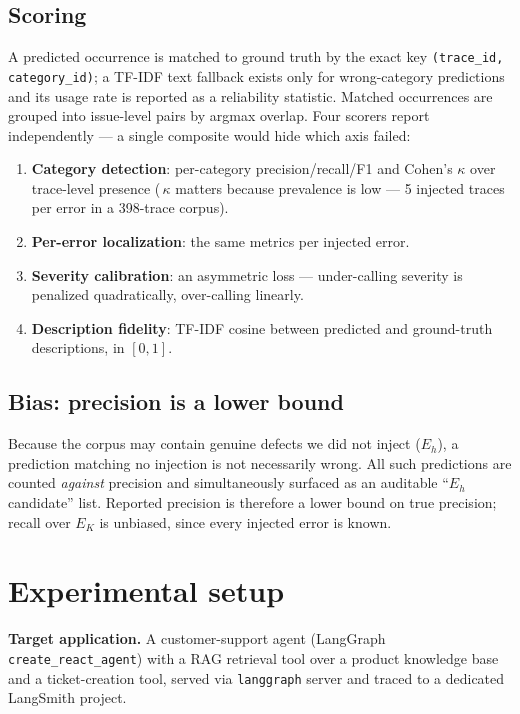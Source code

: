 \documentclass[11pt]{article}
\newcommand{\code}[1]{\texttt{#1}}
\begin{document}
\subsection{Scoring}
\label{sec:scoring}

A predicted occurrence is matched to ground truth by the exact key \code{(trace\_id, category\_id)}; a TF-IDF text fallback exists only for wrong-category predictions and its usage rate is reported as a reliability statistic. Matched occurrences are grouped into issue-level pairs by argmax overlap. Four scorers report independently --- a single composite would hide which axis failed:

\begin{enumerate}
  \item \textbf{Category detection}: per-category precision/recall/F1 and Cohen's $\kappa$ over trace-level presence (\,$\kappa$ matters because prevalence is low --- 5 injected traces per error in a 398-trace corpus).
  \item \textbf{Per-error localization}: the same metrics per injected error.
  \item \textbf{Severity calibration}: an asymmetric loss --- under-calling severity is penalized quadratically, over-calling linearly.
  \item \textbf{Description fidelity}: TF-IDF cosine between predicted and ground-truth descriptions, in $[0,1]$.
\end{enumerate}

\subsection{Bias: precision is a lower bound}
\label{sec:bias}

Because the corpus may contain genuine defects we did not inject ($E_h$), a prediction matching no injection is not necessarily wrong. All such predictions are counted \emph{against} precision and simultaneously surfaced as an auditable ``$E_h$ candidate'' list. Reported precision is therefore a lower bound on true precision; recall over $E_K$ is unbiased, since every injected error is known.

\section{Experimental setup}

\textbf{Target application.} A customer-support agent (LangGraph \code{create\_react\_agent}) with a RAG retrieval tool over a product knowledge base and a ticket-creation tool, served via \code{langgraph} server and traced to a dedicated LangSmith project.
\end{document}
